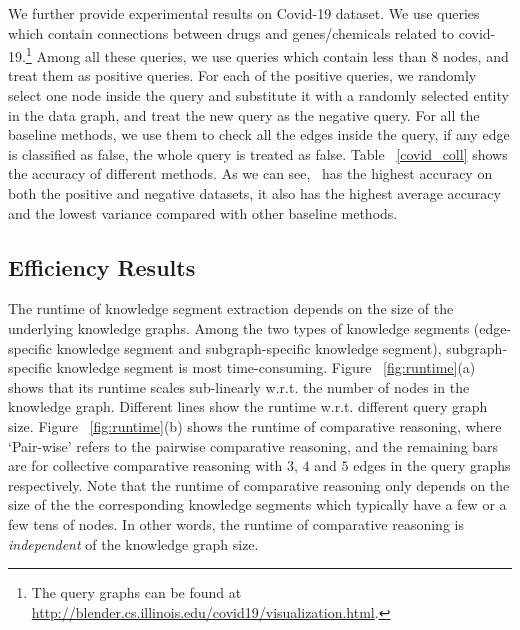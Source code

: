 We further provide experimental results on Covid-19 dataset.
We use queries which contain connections between drugs and genes/chemicals related to covid-19.\footnote{The query graphs can be found at \url{http://blender.cs.illinois.edu/covid19/visualization.html}.}
Among all these queries, we use queries which contain less than 8 nodes, and treat them as positive queries.
For each of the positive queries, we randomly select one node inside the query and substitute it with a randomly selected entity in the data graph, and treat the new query as the negative query.
For all the baseline methods, we use them to check all the edges inside the query, if any edge is classified as false, the whole query is treated as false.
Table ~\ref{covid_coll} shows the accuracy of different methods.
As we can see, \gchecker\ has the highest accuracy on both the positive and negative datasets, it also has the highest average accuracy and the lowest variance compared with other baseline methods.


\subsection{Efficiency Results}

The runtime of knowledge segment extraction depends on the size of the underlying knowledge graphs. Among the two types of knowledge segments (edge-specific knowledge segment and subgraph-specific knowledge segment), subgraph-specific knowledge segment is most time-consuming. Figure ~\ref{fig:runtime}(a) shows that its runtime scales sub-linearly w.r.t. the number of nodes in the knowledge graph. Different lines show the runtime w.r.t. different query graph size.
Figure ~\ref{fig:runtime}(b) shows the runtime of comparative reasoning, where `Pair-wise' refers to the pairwise comparative reasoning, and the remaining bars are for collective comparative reasoning with $3$, $4$ and $5$ edges in the query graphs respectively. Note that the runtime of comparative reasoning only depends on the size of the the corresponding knowledge segments which typically have a few or a few tens of nodes. In other words, the runtime of comparative reasoning is {\em independent} of the knowledge graph size.


